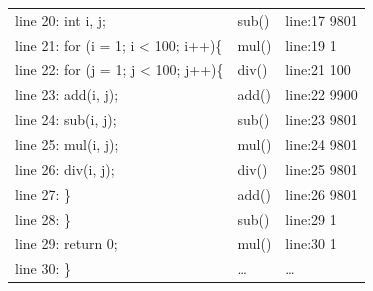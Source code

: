 \begin{table}[ht]
\begin{tabular}{|l|p{3cm}|l|}
line 20: \quad int i, j;& \quad \quad sub()& \quad \quad line:17		9801\\
line 21: \quad for (i = 1; i < 100; i++)\{& \quad \quad mul()& \quad \quad line:19		1\\
line 22: \quad \quad for (j = 1; j < 100; j++)\{& \quad \quad div() & \quad \quad line:21		100\\
line 23: \quad \quad \quad add(i, j);& \quad \quad add()& \quad \quad line:22		9900\\
line 24: \quad \quad \quad sub(i, j);& \quad \quad sub() & \quad \quad line:23		9801\\
line 25: \quad \quad \quad mul(i, j);& \quad \quad mul() & \quad \quad line:24		9801\\
line 26: \quad \quad \quad div(i, j);& \quad \quad div() & \quad \quad line:25		9801\\
line 27: \quad \quad \}& \quad \quad add()& \quad \quad line:26		9801\\
line 28: \quad \}& \quad \quad sub() & \quad \quad line:29		1\\
line 29: \quad return 0;& \quad \quad mul()& \quad \quad line:30		1\\
line 30: \}& \dots & \dots \\
\hline
\end{tabular}
\end{table}

